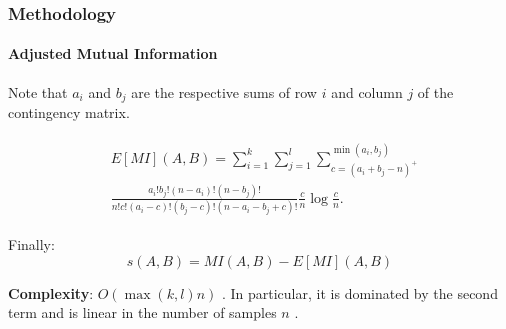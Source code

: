 \documentclass{tum-presentation}
\begin{document}
\begin{frame}
	\frametitle{Methodology}
	\framesubtitle{Adjusted Mutual Information}
	
	Note that $a_i$ and $b_j$ are  the respective sums of row $i$  and column $j$ of the contingency matrix.

	\begin{align}\label{eq:ami}
	\begin{split}
	&E[MI](A,B) = \sum_{i=1}^k\sum_{j=1}^l \sum_{c = (a_i+b_j - n)^+}^{\min(a_i, b_j)} \\
	&\frac{a_i!b_j!(n-a_i)!(n-b_j)!}
	{n!c!(a_i-c)!(b_j-c)!(n-a_i-b_j+c)!}\frac {c}n \log \frac {c}n.
	\end{split}
	\end{align}
	
	Finally: 
	\begin{equation}
	s(A,B) = MI(A,B) - E[MI](A,B)
	\end{equation}
	
	\vspace{1cm}
	
	\textbf{Complexity}: \textbf{$O(\max(k,l)n)$ }. In particular, it is dominated by the second term and is linear in the number of samples $n$ \cite{romano2014standardized}.
	
\end{frame}
\end{document}

